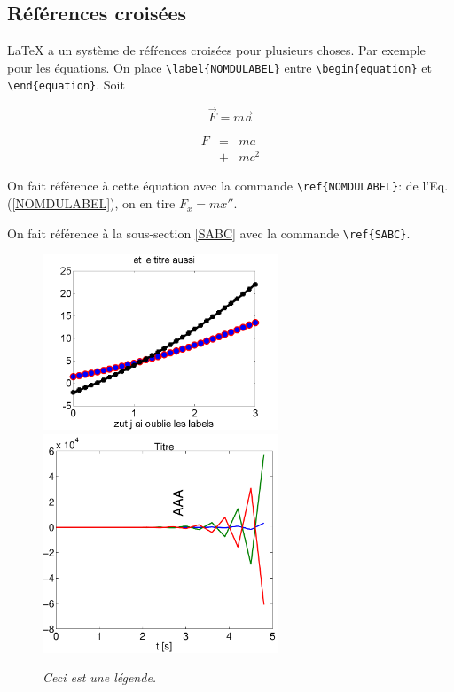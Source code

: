 \documentclass[a4paper,12pt,twoside]{article}
\begin{document}
\subsection{R\'ef\'erences crois\'ees} \label{sec:figures} %

\LaTeX{} a un syst\`eme de r\'ef\'rences crois\'ees pour plusieurs choses.
Par exemple pour les \'equations. On place \verb|\label{NOMDULABEL}| entre
\verb|\begin{equation}| et \verb|\end{equation}|.   Soit

\begin{equation} \label{NOMDULABEL}
\vec{F} =m\vec{a}
\end{equation}

\begin{eqnarray}
F &=& ma  \nonumber\\
&+& mc^2
\end{eqnarray}

On fait r\'ef\'erence \`a cette \'equation avec la commande \verb|\ref{NOMDULABEL}|: de l'Eq.(\ref{NOMDULABEL}), on en tire $F_x=mx''$.

On fait r\'ef\'erence \`a la sous-section \ref{SABC} avec la commande
\verb|\ref{SABC}|.

\begin{figure} %
\begin{center}
\includegraphics[width=7cm,angle=0]{ohmabellefigure}
\includegraphics[width=7cm,angle=0]{aa}
\end{center}
\caption{\em \label{fig:Plot}
Ceci est une l\'egende.
}
\end{figure} %
\end{document}
